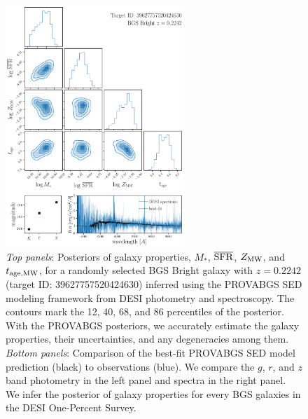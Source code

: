 \begin{figure}
\begin{center}
    \includegraphics[width=0.6\textwidth]{figs/provabgs_posterior.pdf}
    \caption{
        {\em Top panels}: 
        Posteriors of galaxy properties, $M_*$, $\overline{\rm SFR}$, 
        $Z_{\rm MW}$, and $t_{\rm age, MW}$, for a randomly selected BGS 
        Bright galaxy with $z=0.2242$ (target ID: 39627757520424630) inferred
        using the PROVABGS SED modeling framework from DESI photometry and
        spectroscopy. 
        The contours mark the 12, 40, 68, and 86 percentiles of the posterior. 
        With the PROVABGS posteriors, we accurately estimate the galaxy
        properties, their uncertainties, and any degeneracies among them. 
        {\em Bottom panels}: 
        Comparison of the best-fit PROVABGS SED model prediction (black) to
        observations (blue). 
        We compare the $g$, $r$, and $z$ band photometry in the left panel and 
        spectra in the right panel. 
        We infer the posterior of galaxy properties for every BGS galaxies in
        the DESI One-Percent Survey.
    }\label{fig:posterior}
\end{center}
\end{figure}


